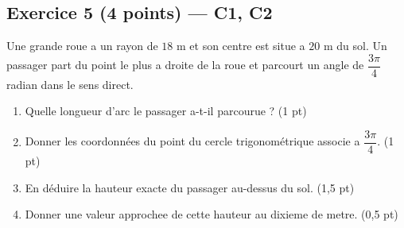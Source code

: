 \subsection*{Exercice 5 \hfill (4 points) — C1, C2}

Une grande roue a un rayon de $18$ m et son centre est situe a $20$ m du sol. Un passager part du point le plus a droite de la roue et parcourt un angle de $\dfrac{3\pi}{4}$ radian dans le sens direct.

\begin{enumerate}
  \item Quelle longueur d'arc le passager a-t-il parcourue ? \hfill (1 pt)
  \item Donner les coordonnées du point du cercle trigonométrique associe a $\dfrac{3\pi}{4}$. \hfill (1 pt)
  \item En déduire la hauteur exacte du passager au-dessus du sol. \hfill (1,5 pt)
  \item Donner une valeur approchee de cette hauteur au dixieme de metre. \hfill (0,5 pt)
\end{enumerate}

